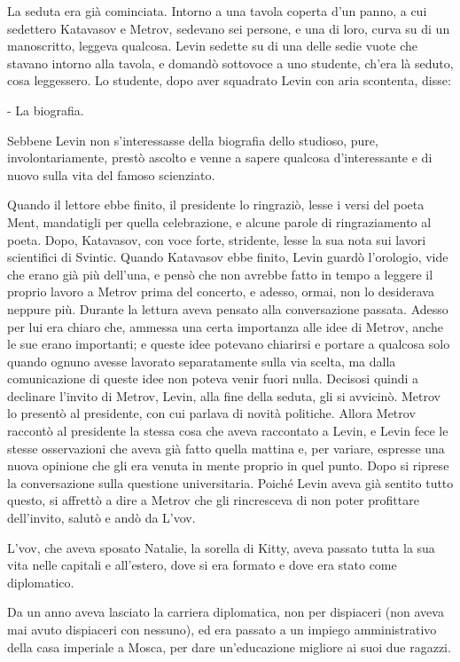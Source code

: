 La seduta era già cominciata. Intorno a una tavola coperta d'un panno, a cui sedettero Katavasov e Metrov, sedevano sei persone, e una di loro, curva su di un manoscritto, leggeva qualcosa. Levin sedette su di una delle sedie vuote che stavano intorno alla tavola, e domandò sottovoce a uno studente, ch'era là seduto, cosa leggessero. Lo studente, dopo aver squadrato Levin con aria scontenta, disse: 

- La biografia. 

Sebbene Levin non s'interessasse della biografia dello studioso, pure, involontariamente, prestò ascolto e venne a sapere qualcosa d'interessante e di nuovo sulla vita del famoso scienziato. 

Quando il lettore ebbe finito, il presidente lo ringraziò, lesse i versi del poeta Ment, mandatigli per quella celebrazione, e alcune parole di ringraziamento al poeta. Dopo, Katavasov, con voce forte, stridente, lesse la sua nota sui lavori scientifici di Svintic. Quando Katavasov ebbe finito, Levin guardò l'orologio, vide che erano già più dell'una, e pensò che non avrebbe fatto in tempo a leggere il proprio lavoro a Metrov prima del concerto, e adesso, ormai, non lo desiderava neppure più. Durante la lettura aveva pensato alla conversazione passata. Adesso per lui era chiaro che, ammessa una certa importanza alle idee di Metrov, anche le sue erano importanti; e queste idee potevano chiarirsi e portare a qualcosa solo quando ognuno avesse lavorato separatamente sulla via scelta, ma dalla comunicazione di queste idee non poteva venir fuori nulla. Decisosi quindi a declinare l'invito di Metrov, Levin, alla fine della seduta, gli si avvicinò. Metrov lo presentò al presidente, con cui parlava di novità politiche. Allora Metrov raccontò al presidente la stessa cosa che aveva raccontato a Levin, e Levin fece le stesse osservazioni che aveva già fatto quella mattina e, per variare, espresse una nuova opinione che gli era venuta in mente proprio in quel punto. Dopo si riprese la conversazione sulla questione universitaria. Poiché Levin aveva già sentito tutto questo, si affrettò a dire a Metrov che gli rincresceva di non poter profittare dell'invito, salutò e andò da L'vov. 

\label{iv-6} 

L'vov, che aveva sposato Natalie, la sorella di Kitty, aveva passato tutta la sua vita nelle capitali e all'estero, dove si era formato e dove era stato come diplomatico. 

Da un anno aveva lasciato la carriera diplomatica, non per dispiaceri (non aveva mai avuto dispiaceri con nessuno), ed era passato a un impiego amministrativo della casa imperiale a Mosca, per dare un'educazione migliore ai suoi due ragazzi. 

